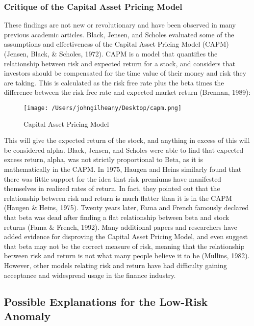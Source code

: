 \documentclass[12pt,twoside]{reedthesis}
\theoremstyle{definition}
\theoremstyle{definition}
\theoremstyle{definition}
\theoremstyle{remark}
\begin{document}
\subsubsection{Critique of the Capital Asset Pricing
Model}\label{critique-of-the-capital-asset-pricing-model}

These findings are not new or revolutionary and have been observed in
many previous academic articles. Black, Jensen, and Scholes evaluated
some of the assumptions and effectiveness of the Capital Asset Pricing
Model (CAPM) (Jensen, Black, \& Scholes, 1972). CAPM is a model that
quantifies the relationship between risk and expected return for a
stock, and considers that investors should be compensated for the time
value of their money and risk they are taking. This is calculated as the
risk free rate plus the beta times the difference between the risk free
rate and expected market return (Brennan, 1989):
\begin{figure}
\centerline{\texttt{[image: /Users/johngilheany/Desktop/capm.png]}}
\caption{Capital Asset Pricing Model}
\label{CAPM}
\end{figure}
This will give the expected return of the stock, and anything in excess
of this will be considered alpha. Black, Jensen, and Scholes were able
to find that expected excess return, alpha, was not strictly
proportional to Beta, as it is mathematically in the CAPM. In 1975,
Haugen and Heins similarly found that there was little support for the
idea that risk premiums have manifested themselves in realized rates of
return. In fact, they pointed out that the relationship between risk and
return is much flatter than it is in the CAPM (Haugen \& Heins, 1975).
Twenty years later, Fama and French famously declared that beta was dead
after finding a flat relationship between beta and stock returns (Fama
\& French, 1992). Many additional papers and researchers have added
evidence for disproving the Capital Asset Pricing Model, and even
suggest that beta may not be the correct measure of risk, meaning that
the relationship between risk and return is not what many people believe
it to be (Mullins, 1982). However, other models relating risk and return
have had difficulty gaining acceptance and widespread usage in the
finance industry.

\subsection{Possible Explanations for the Low-Risk
Anomaly}\label{possible-explanations-for-the-low-risk-anomaly}
\end{document}
